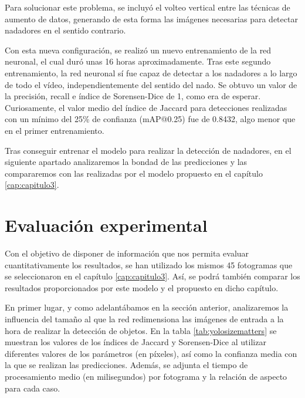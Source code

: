 Para solucionar este problema, se incluyó el volteo vertical entre las técnicas de aumento de datos, generando de esta forma las imágenes necesarias para detectar nadadores en el sentido contrario. 

Con esta nueva configuración, se realizó un nuevo entrenamiento de la red neuronal, el cual duró unas 16 horas aproximadamente. Tras este segundo entrenamiento, la red neuronal sí fue capaz de detectar a los nadadores a lo largo de todo el vídeo, independientemente del sentido del nado. Se obtuvo un valor de la precisión, recall e índice de Sorensen-Dice de 1, como era de esperar. Curiosamente, el valor medio del índice de Jaccard  para detecciones realizadas con un mínimo del 25\% de confianza (mAP@0.25) fue de 0.8432, algo menor que en el primer entrenamiento. 

Tras conseguir entrenar el modelo para realizar la detección de nadadores, en el siguiente apartado analizaremos la bondad de las predicciones y las compararemos con las realizadas por el modelo propuesto en el capítulo \ref{cap:capitulo3}.

\section{Evaluación experimental} \label{evaluacionexpyolo}

Con el objetivo de disponer de información que nos permita evaluar cuantitativamente los resultados, se han utilizado los mismos 45 fotogramas que se seleccionaron en el capítulo \ref{cap:capitulo3}. Así, se podrá también comparar los resultados proporcionados por este modelo y el propuesto en dicho capítulo.

En primer lugar, y como adelantábamos en la sección anterior, analizaremos la influencia del tamaño al que la red redimensiona las imágenes de entrada a la hora de realizar la detección de objetos. En la tabla \ref{tab:yolosizematters} se muestran los valores de los índices de Jaccard y Sorensen-Dice al utilizar diferentes valores de los parámetros (en píxeles), así como la confianza media con la que se realizan las predicciones. Además, se adjunta el tiempo de procesamiento medio (en milisegundos) por fotograma y la relación de aspecto para cada caso. 

